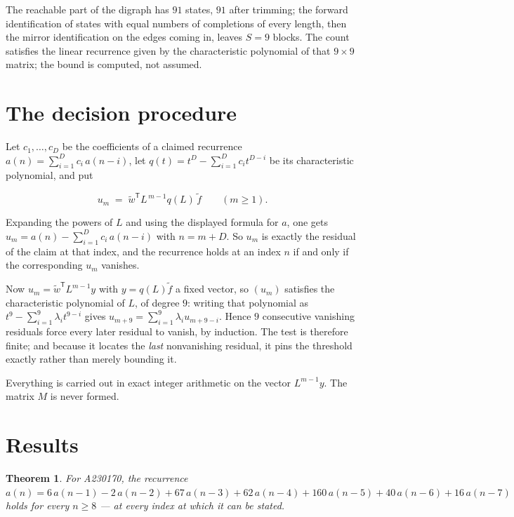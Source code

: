\documentclass[11pt]{article}
\newtheorem{theorem}{Theorem}
\theoremstyle{definition}
\begin{document}
The reachable part of the digraph has $91$ states, $91$ after trimming; the forward identification of states with equal numbers of completions of every length, then the mirror identification on the edges coming in, leaves $S = 9$ blocks. The count satisfies the linear recurrence given by the characteristic polynomial of that $9\times9$ matrix; the bound is computed, not assumed.

\section{The decision procedure}

Let $c_1,\dots,c_D$ be the coefficients of a claimed recurrence $a(n) = \sum_{i=1}^{D} c_i\,a(n-i)$, let $q(t) = t^{D} - \sum_{i=1}^{D} c_i t^{D-i}$ be its characteristic polynomial, and put

\[u_m \;=\; \tilde w^{\mathsf T} L^{\,m-1} q(L)\,\tilde f \qquad (m \ge 1).\]

Expanding the powers of $L$ and using the displayed formula for $a$, one gets $u_m = a(n) - \sum_{i=1}^{D} c_i\,a(n-i)$ with $n = m + D$. So $u_m$ is exactly the residual of the claim at that index, and the recurrence holds at an index $n$ if and only if the corresponding $u_m$ vanishes.

Now $u_m = \tilde w^{\mathsf T} L^{m-1} y$ with $y = q(L)\tilde f$ a fixed vector, so $(u_m)$ satisfies the characteristic polynomial of $L$, of degree $9$: writing that polynomial as $t^{9} - \sum_{i=1}^{9} \lambda_i t^{9-i}$ gives $u_{m+9} = \sum_{i=1}^{9} \lambda_i u_{m+9-i}$. Hence $9$ consecutive vanishing residuals force every later residual to vanish, by induction. The test is therefore finite; and because it locates the {\itshape last} nonvanishing residual, it pins the threshold exactly rather than merely bounding it.

Everything is carried out in exact integer arithmetic on the vector $L^{m-1}y$. The matrix $M$ is never formed.

\section{Results}

\begin{theorem} For A230170, the recurrence $a(n) = 6\,a(n-1) - 2\,a(n-2) + 67\,a(n-3) + 62\,a(n-4) + 160\,a(n-5) + 40\,a(n-6) + 16\,a(n-7)$ holds for every $n \ge 8$ --- at every index at which it can be stated.\end{theorem}
\end{document}
